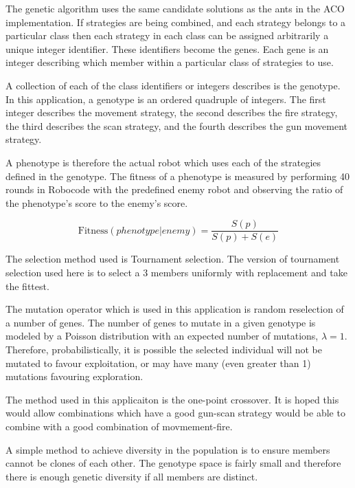 The genetic algorithm uses the same candidate solutions as the ants in the ACO implementation. 
If strategies are being combined, and each strategy belongs to a particular class then each strategy in each class can be assigned arbitrarily a unique integer identifier. These identifiers become the genes. Each gene is an integer describing which member within a particular class of strategies to use.

A collection of each of the class identifiers or integers describes is the genotype. In this application, a genotype is an ordered quadruple of integers. The first integer describes the movement strategy, the second describes the fire strategy, the third describes the scan strategy, and the fourth describes the gun movement strategy.

A phenotype is therefore the actual robot which uses each of the strategies defined in the genotype. The fitness of a phenotype is measured by performing 40 rounds in Robocode with the predefined enemy robot and observing the ratio of the phenotype's score to the enemy's score.

\begin{equation}
\label{eqn:fitness}
\text{Fitness}\left({phenotype}|{enemy}\right) = 
\frac{S(p)}{S(p) + S(e)}
\end{equation}

The selection method used is Tournament selection. The version of tournament selection used here is to select a 3 members uniformly with replacement and take the fittest.

The mutation operator which is used in this application is random reselection of a number of genes. The number of genes to mutate in a given genotype is modeled by a Poisson distribution with an expected number of mutations, $\lambda = 1$. Therefore, probabilistically, it is possible the selected individual will not be mutated to favour exploitation, or may have many (even greater than 1)  mutations favouring exploration.

The method used in this applicaiton is the one-point crossover. It is hoped this would allow combinations which have a good gun-scan strategy would be able to combine with a good combination of movmement-fire.

A simple method to achieve diversity in the population is to ensure members cannot be clones of each other. The genotype space is fairly small and therefore there is enough genetic diversity if all members are distinct.
